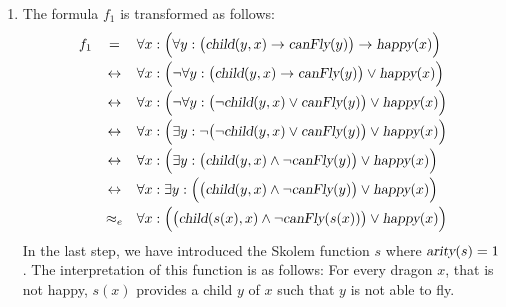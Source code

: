 \begin{enumerate}
\item The formula $f_1$ is transformed as follows:
 $$ 
  \begin{array}{lcl}
    f_1 & =           & \forall x:\Bigl(\forall y: \big(\textsl{child}(y,x)
    \rightarrow \textsl{canFly}(y)\big) \rightarrow \textsl{happy}(x) \Bigr) \\[0.2cm]
    &\leftrightarrow & \forall x: \Bigl(\neg \forall y: \big( \textsl{child}(y,x) \rightarrow \textsl{canFly}(y)\big) \vee \textsl{happy}(x) \Bigr)\\[0.2cm]
    &\leftrightarrow & \forall x: \Bigl(\neg \forall y: \big( \neg \textsl{child}(y,x) \vee \textsl{canFly}(y)\big) \vee \textsl{happy}(x) \Bigr)\\[0.2cm]
    &\leftrightarrow & \forall x: \Bigl(\exists y: \neg \big( \neg \textsl{child}(y,x) \vee \textsl{canFly}(y)\big) \vee \textsl{happy}(x) \Bigr)\\[0.2cm]
    &\leftrightarrow & \forall x: \Bigl( \exists y: \big(\textsl{child}(y,x) \wedge \neg  \textsl{canFly}(y)\big) \vee \textsl{happy}(x) \Bigr)\\[0.2cm]
    &\leftrightarrow & \forall x:  \exists y: \Bigl(\big( \textsl{child}(y,x) \wedge \neg  \textsl{canFly}(y)\big) \vee \textsl{happy}(x) \Bigr)\\[0.2cm]
    &\approx_e & \forall x: \Bigl(\big( \textsl{child}(s(x),x) \wedge \neg  \textsl{canFly}(s(x))\big) \vee \textsl{happy}(x) \Bigr)\\
  \end{array}
     $$
      In the last step, we have introduced the  Skolem function $s$ where
      $\textsl{arity}(s) = 1$.  The interpretation of this function is as follows:  For every dragon
      $x$, that is not happy, $s(x)$ provides a child  $y$ of $x$ such that $y$ is not able to fly.


\end{enumerate}

